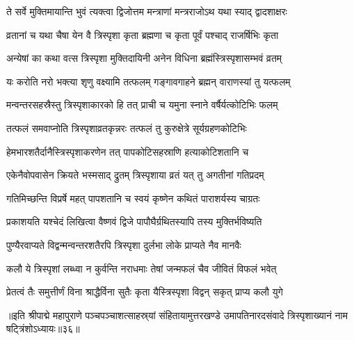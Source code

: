 \twolineshloka
{ते सर्वे मुक्तिमायान्ति भुवं त्यक्त्वा द्विजोत्तम}
{मन्त्राणां मन्त्रराजोऽथ यथा स्याद् द्वादशाक्षरः}%

\twolineshloka
{व्रतानां च यथा चैषा येन वै त्रिस्पृशा कृता}
{ब्रह्मणा च कृता पूर्वं पश्चाद् राजर्षिभिः कृता}%

\twolineshloka
{अन्येषां का कथा वत्स त्रिस्पृशा मुक्तिदायिनी}
{अनेन विधिना ब्रह्मंस्त्रिस्पृशासम्भवं व्रतम्}%

\twolineshloka
{यः करोति नरो भक्त्या शृणु वक्ष्यामि तत्फलम्}
{गङ्गावगाहने ब्रह्मन् वाराणस्यां तु यत्फलम्}%

\twolineshloka
{मन्वन्तरसहस्रैस्तु त्रिस्पृशाकारको हि तत्}
{प्राची च यमुना स्नाने वर्षैर्यत्कोटिभिः फलम्}%

\twolineshloka
{तत्फलं समवाप्नोति त्रिस्पृशाव्रतकृन्नरः}
{तत्फलं तु कुरुक्षेत्रे सूर्यग्रहणकोटिभिः}%

\twolineshloka
{हेमभारशतैर्दानैस्त्रिस्पृशाकरणेन तत्}
{पापकोटिसहस्राणि हत्याकोटिशतानि च}%

\twolineshloka
{एकेनैवोपवासेन क्रियते भस्मसाद् द्रुतम्}
{त्रिस्पृशाया व्रतं यत् तु अगतीनां गतिप्रदम्}%

\twolineshloka
{गतिमिच्छन्ति विप्रर्षे महत् पापशतानि च}
{स्वयं कृष्णेन कथितं पाराशर्यस्य चाग्रतः}%

\twolineshloka
{प्रकाशयति यश्चेदं लिखित्वा वैष्णवं द्विजे}
{पापौघैर्ग्रथितस्यापि तस्य मुक्तिर्भविष्यति}%

\twolineshloka
{पुण्यैरवाप्यते विद्वन्मन्वन्तरशतैरपि}
{त्रिस्पृशा दुर्लभा लोके प्राप्यते नैव मानवैः}%

\twolineshloka
{कलौ ये त्रिस्पृशां लब्ध्वा न कुर्वन्ति नराधमाः}
{तेषां जन्मफलं चैव जीवितं विफलं भवेत्}%

\twolineshloka
{प्रेतत्वं तैः समुत्तीर्णं विना श्राद्धैर्विना सुतैः}
{कृता यैस्त्रिस्पृशा विद्वन् सकृत् प्राप्य कलौ युगे}%

॥इति श्रीपाद्मे महापुराणे पञ्चपञ्चाशत्साहस्र्यां संहितायामुत्तरखण्डे उमापतिनारदसंवादे त्रिस्पृशाख्यानं नाम षट्त्रिंशोऽध्यायः॥३६॥

\genMangalaShloka

\hyperref[sec:ekadashi_mahatmyam_padma_puranam]{\closesub}
\clearpage

